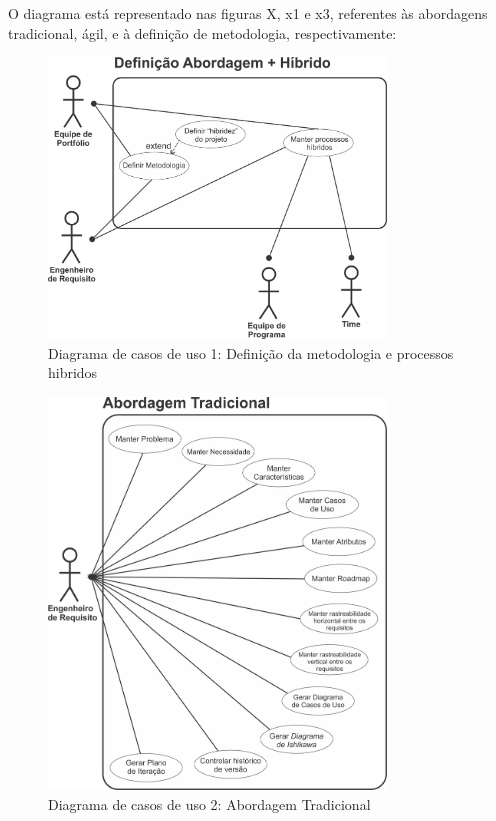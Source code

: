 O diagrama está representado nas figuras X, x1 e x3, referentes às abordagens tradicional, ágil, e à definição de metodologia, respectivamente:
\begin{figure}[H]
	\centering
	\includegraphics[width=0.8\textwidth]{imgModelagem/DiagramaUC1}
	\caption{Diagrama de casos de uso 1: Definição da metodologia e processos hibridos}
	\label{img:DiagramaUC1}
\end{figure}

\begin{figure}[H]
	\centering
	\includegraphics[width=0.8\textwidth]{imgModelagem/DiagramaUC2}
	\caption{Diagrama de casos de uso 2: Abordagem Tradicional}
	\label{img:DiagramaUC2}
\end{figure}


